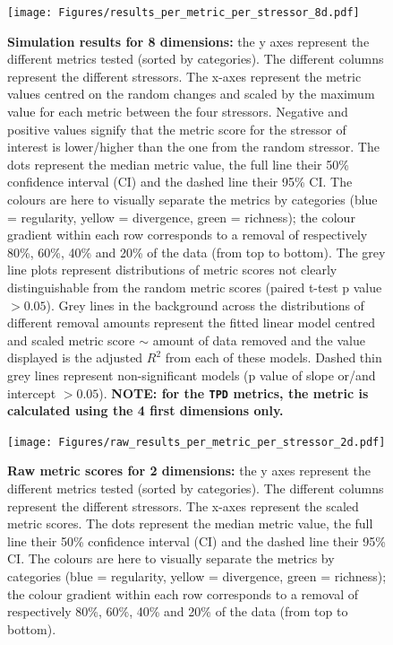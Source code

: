 \documentclass[12pt,letterpaper]{article}
\begin{document}
\begin{figure}[!htbp]
\centering
   \texttt{[image: Figures/results\_per\_metric\_per\_stressor\_8d.pdf]}
\caption{\scriptsize{\textbf{Simulation results for 8 dimensions:} the y axes represent the different metrics tested (sorted by categories).
The different columns represent the different stressors. The x-axes represent the metric values centred on the random changes and scaled by the maximum value for each metric between the four stressors.
Negative and positive values signify that the metric score for the stressor of interest is lower/higher than the one from the random stressor.
The dots represent the median metric value, the full line their 50\% confidence interval (CI) and the dashed line their 95\% CI.
The colours are here to visually separate the metrics by categories (blue = regularity, yellow = divergence, green = richness); the colour gradient within each row corresponds to a removal of respectively 80\%, 60\%, 40\% and 20\% of the data (from top to bottom).
The grey line plots represent distributions of metric scores not clearly distinguishable from the random metric scores (paired t-test p value $> 0.05$).
Grey lines in the background across the distributions of different removal amounts represent the fitted linear model centred and scaled metric score $\sim$ amount of data removed and the value displayed is the adjusted $R^2$ from each of these models.
Dashed thin grey lines represent non-significant models (p value of slope or/and intercept $> 0.05$).
\textbf{NOTE: for the \texttt{TPD} metrics, the metric is calculated using the 4 first dimensions only.}
}}
\label{Fig:simulation_results_8d}
\end{figure}
\bigskip





\begin{figure}[!htbp]
\centering
   \texttt{[image: Figures/raw\_results\_per\_metric\_per\_stressor\_2d.pdf]}
\caption{\scriptsize{\textbf{Raw metric scores for 2 dimensions:} the y axes represent the different metrics tested (sorted by categories).
The different columns represent the different stressors.
The x-axes represent the scaled metric scores.
The dots represent the median metric value, the full line their 50\% confidence interval (CI) and the dashed line their 95\% CI.
The colours are here to visually separate the metrics by categories (blue = regularity, yellow = divergence, green = richness); the colour gradient within each row corresponds to a removal of respectively 80\%, 60\%, 40\% and 20\% of the data (from top to bottom).
}}
\label{Fig:raw_results_2d}
\end{figure}
\bigskip
\end{document}
